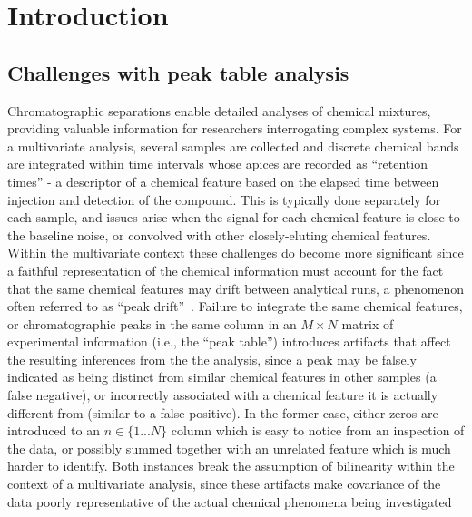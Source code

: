 \documentclass[preprint,12pt]{elsarticle}
\providecommand{\DIFadd}[1]{{\protect\color{blue}\uwave{#1}}} %
\providecommand{\DIFdel}[1]{{\protect\color{red}\sout{#1}}}                      %
\providecommand{\DIFaddbegin}{} %
\providecommand{\DIFdelbegin}{} %
\providecommand{\DIFdelend}{} %
\begin{document}

\section{Introduction}
\label{sec:sample1}
\subsection{Challenges with peak table analysis}
Chromatographic separations enable detailed analyses of chemical mixtures, providing valuable information for researchers interrogating complex systems. For a multivariate analysis, several samples are collected and discrete chemical bands are integrated within time intervals whose apices are recorded as ``retention times'' - a descriptor of a chemical feature based on the elapsed time between injection and detection of the compound. This is typically done separately for each sample, and issues arise when the signal for each chemical feature is close to the baseline noise, or convolved with other closely-eluting chemical features. Within the multivariate context these challenges do become more significant since a faithful representation of the chemical information must account for the fact that the same chemical features may drift between analytical runs, a phenomenon often referred to as ``peak drift''~\cite{christensen2005chromatographic}. Failure to integrate the same chemical features, or chromatographic peaks in the same column in an $M \times N$ matrix of experimental information (i.e., the ``peak table'') introduces artifacts that affect the resulting inferences from the the analysis, since a peak may be falsely indicated as being distinct from similar chemical features in other samples (a false negative), or incorrectly associated with a chemical feature it is actually different from (similar to a false positive). In the former case, either zeros are introduced to an $n \in \{1...N\}$ column which is easy to notice from an inspection of the data, or possibly summed together with an unrelated feature which is much harder to identify. Both instances break the assumption of bilinearity within the context of a multivariate analysis, since these artifacts make covariance of the data poorly representative of the actual chemical phenomena being investigated \DIFdelbegin \DIFdel{\mbox{%
\cite{armstrong2023parafac2}}\hskip0pt%
}\DIFdelend \DIFaddbegin \DIFadd{\mbox{%
\cite{armstrong2023parafac2,de2012integration}}\hskip0pt%
. 
}
\end{document}
